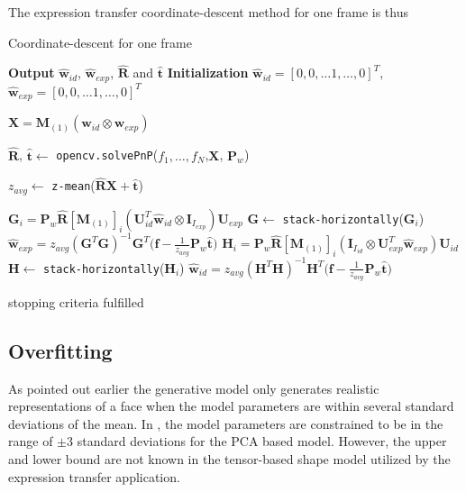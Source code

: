 \documentclass[11pt,a4paper]{report}
\begin{document}
The expression transfer coordinate-descent method for one frame is thus
\begin{algorithm}\label{a:coorddesc}
\caption{Coordinate-descent for one frame}
\begin{algorithmic}[1]

\State \textbf{Output} $\mathbf{\hat{w}}_{id}$, $\mathbf{\hat{w}}_{exp}$,
$\mathbf{\hat{R}}$ and $\mathbf{\hat{t}}$
\State \textbf{Initialization} $\mathbf{\hat{w}}_{id} = [0,0, \ldots 1, \ldots
  ,0]^T$, $\mathbf{\hat{w}}_{exp} = [0,0, \ldots 1, \ldots ,0]^T$
\Repeat

\State $\mathbf{X} = \mathbf{M}_{(1)}(\mathbf{w}_{id} \otimes \mathbf{w}_{exp})$ 

\State $\mathbf{\hat{R}}$, $\mathbf{\hat{t}} \gets $
\texttt{opencv.solvePnP}($f_1, \ldots ,f_N$,$\mathbf{X}$, $\mathbf{P}_w$)

\State

\State $z_{avg} \gets$ \texttt{z-mean}($\mathbf{\hat{R}}\mathbf{X} + \mathbf{\hat{t}}$)

\State

\State $\mathbf{G}_i = \mathbf{P}_w\mathbf{\hat{R}}[\mathbf{M}_{(1)}]_{i}(\mathbf{U}_{id}^T\mathbf{\hat{w}}_{id}
\otimes \mathbf{I}_{I_{exp}})\mathbf{U}_{exp}$
\State $\mathbf{G} \gets $ \texttt{stack-horizontally}($\mathbf{G}_i$)
\State
\State $\mathbf{\hat{w}}_{exp} = z_{avg}(\mathbf{G}^T\mathbf{G})^{-1}\mathbf{G}^T\bigl(\mathbf{f} - \frac{1}{z_{avg}}\mathbf{P}_w\mathbf{\hat{t}}\bigr)$
\State
\State $\mathbf{H}_i = \mathbf{P}_w\mathbf{\hat{R}}[\mathbf{M}_{(1)}]_{i}(\mathbf{I}_{I_{id}}
\otimes \mathbf{U}_{exp}^T\mathbf{\hat{w}}_{exp})\mathbf{U}_{id}$
\State $\mathbf{H} \gets $ \texttt{stack-horizontally}($\mathbf{H}_i$)
\State
\State $\mathbf{\hat{w}}_{id} = z_{avg}(\mathbf{H}^T\mathbf{H})^{-1}\mathbf{H}^T\bigl(\mathbf{f} - \frac{1}{z_{avg}}\mathbf{P}_w\mathbf{\hat{t}}\bigr)$

\Until stopping criteria fulfilled

\EndProcedure
\end{algorithmic}
\end{algorithm}

\subsection{Overfitting}\label{s:overfitting}
As pointed out earlier the generative model only generates realistic
representations of a face when the model parameters are within several standard
deviations of the mean. In \cite{blanz1}, \cite{jacey} the model parameters are constrained to
be in the range of $\pm$3 standard deviations for the PCA based model. However, the upper and
lower bound are not known in the tensor-based shape model utilized by the
expression transfer application. 
\end{document}
